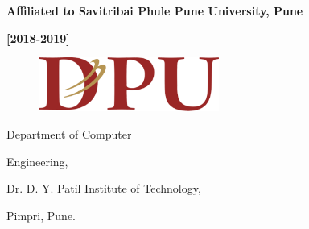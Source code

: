 \documentclass[12pt]{article}
\begin{document}
\begin{adjustwidth}{1.0in}{-0.47in}
\begin{justify}
{\fontsize{11pt}{13.2pt}\selectfont \textbf{Affiliated to Savitribai Phule Pune University, Pune}\par}
\end{justify}\par

\end{adjustwidth}

\begin{adjustwidth}{1.0in}{-0.5in}
\begin{justify}
{\fontsize{16pt}{19.2pt}\selectfont \textbf{[2018-2019]}\par}
\end{justify}\par

\end{adjustwidth}


\vspace{\baselineskip}
\setlength{\parskip}{9.96pt}



\newpage
\thispagestyle{empty}



{

\begin{figure}
\includegraphics[width=2.33in,height=0.7in]{./media/image2.png}
\end{figure}




{\fontsize{16pt}{19.2pt}\selectfont \textcolor[HTML]{1F497D}{ Department of Computer}\par}\par




{\fontsize{16pt}{19.2pt}\selectfont \textcolor[HTML]{1F497D}{Engineering,}\par}\par



\begin{adjustwidth}{0.28in}{0.0in}
{\fontsize{15pt}{18.0pt}\selectfont \textcolor[HTML]{1F497D}{Dr. D. Y. Patil Institute of Technology,}{\fontsize{16pt}{19.2pt}\selectfont\par \textcolor[HTML]{1F497D}{Pimpri, Pune.}\par}\par}\par

\end{adjustwidth}
}
\end{document}
